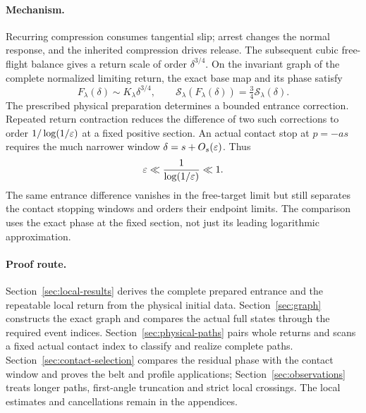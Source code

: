 \paragraph{Mechanism.}
Recurring compression consumes tangential slip; arrest changes the
normal response, and the inherited compression drives release.
The subsequent cubic free-flight balance gives a return scale
of order $\delta^{3/4}$. On the invariant graph of the complete
normalized limiting return, the exact base map and its phase satisfy
\[
 F_\lambda(\delta)\sim K_\lambda\delta^{3/4},\qquad
 \mathcal S_\lambda(F_\lambda(\delta))
       =\tfrac34\mathcal S_\lambda(\delta).
\]
The prescribed physical preparation determines a bounded entrance
correction. Repeated return contraction reduces the difference of
two such corrections to order $1/\log(1/\varepsilon)$ at a fixed positive
section. An actual contact stop at $p=-as$ requires the much narrower
window $\delta=s+O_s(\varepsilon)$. Thus
\[
 \varepsilon\ll\frac1{\log(1/\varepsilon)}\ll1.
\]
The same entrance difference vanishes in the free-target limit but
still separates the contact stopping windows and orders their
endpoint limits. The comparison uses the exact phase at the fixed
section, not just its leading logarithmic approximation.

\paragraph{Proof route.}
Section~\ref{sec:local-results} derives the complete prepared entrance
and the repeatable local return from the physical initial data.
Section~\ref{sec:graph} constructs the exact graph and compares the
actual full states through the required event indices.
Section~\ref{sec:physical-paths} pairs whole returns and scans a
fixed actual contact index to classify and realize complete paths.
Section~\ref{sec:contact-selection} compares the residual phase with
the contact window and proves the belt and profile applications;
Section~\ref{sec:observations} treats longer paths, first-angle
truncation and strict local crossings. The local estimates and
cancellations remain in the appendices.
